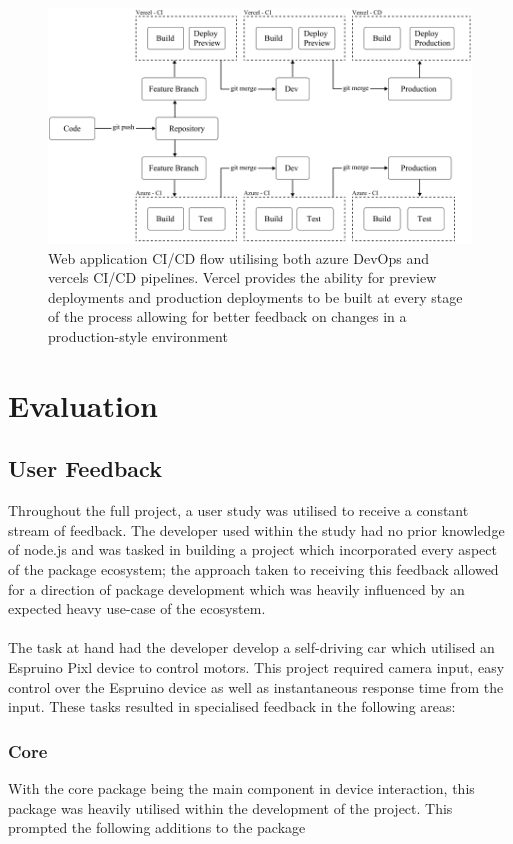 \documentclass{l4proj}
\begin{document}
\begin{figure}[H]
    \centering
    \includegraphics[width=14cm]{dissertation/images/web-app-deploy.png}
    \caption{Web application CI/CD flow utilising both azure DevOps and vercels CI/CD pipelines. Vercel provides the ability for preview deployments and production deployments to be built at every stage of the process allowing for better feedback on changes in a production-style environment}
    \label{fig:web-app-deploy}
\end{figure}

\chapter{Evaluation} 

\section{User Feedback}
Throughout the full project, a user study was utilised to receive a constant stream of feedback. The developer used within the study had no prior knowledge of node.js and was tasked in building a project which incorporated every aspect of the package ecosystem; the approach taken to receiving this feedback allowed for a direction of package development which was heavily influenced by an expected heavy use-case of the ecosystem.
\\ \\
The task at hand had the developer develop a self-driving car which utilised an Espruino Pixl device to control motors. This project required camera input, easy control over the Espruino device as well as instantaneous response time from the input. These tasks resulted in specialised feedback in the following areas:

\subsection{Core}
With the core package being the main component in device interaction, this package was heavily utilised within the development of the project. This prompted the following additions to the package
\end{document}
